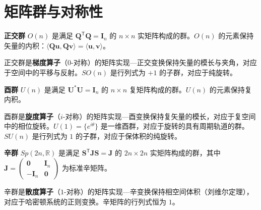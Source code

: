\section{\texorpdfstring{矩阵群与对称性}{矩阵群与对称性}}

\begin{definition}[正交群]\label{def:orthogonal_group}
\textbf{正交群} $O(n)$ 是满足 $\mathbf{Q}^{\mathsf T} \mathbf{Q} = \mathbf{I}_n$ 的 $n \times n$ 实矩阵构成的群。$O(n)$ 的元素保持矢量的内积：$\langle \mathbf{Q}\mathbf{u}, \mathbf{Q}\mathbf{v} \rangle = \langle \mathbf{u}, \mathbf{v} \rangle$。

正交群是\textbf{梯度算子}（$0$-对称）的矩阵实现---正交变换保持矢量的模长与夹角，对应于空间中的平移与反射。$SO(n)$ 是行列式为 $+1$ 的子群，对应于纯旋转。
\end{definition}

\begin{definition}[酉群]\label{def:unitary_group}
\textbf{酉群} $U(n)$ 是满足 $\mathbf{U}^* \mathbf{U} = \mathbf{I}_n$ 的 $n \times n$ 复矩阵构成的群。$U(n)$ 的元素保持复内积。

酉群是\textbf{旋度算子}（$i$-对称）的矩阵实现---酉变换保持复矢量的模长，对应于复空间中的相位旋转。$U(1) = \{e^{i\theta}\}$ 是一维酉群，对应于旋转的具有周期轨道的群。$SU(n)$ 是行列式为 $1$ 的子群，对应于保体积的纯旋转。
\end{definition}

\begin{definition}[辛群]\label{def:symplectic_group}
\textbf{辛群} $Sp(2n, \mathbb{R})$ 是满足 $\mathbf{S}^{\mathsf T} \mathbf{J} \mathbf{S} = \mathbf{J}$ 的 $2n \times 2n$ 实矩阵构成的群，其中 $\mathbf{J} = \begin{pmatrix} \mathbf{0} & \mathbf{I}_n \\ -\mathbf{I}_n & \mathbf{0} \end{pmatrix}$ 为标准辛矩阵。

辛群是\textbf{散度算子}（$1$-对称）的矩阵实现---辛变换保持相空间体积（刘维尔定理），对应于哈密顿系统的正则变换。辛矩阵的行列式恒为 $1$。
\end{definition}


